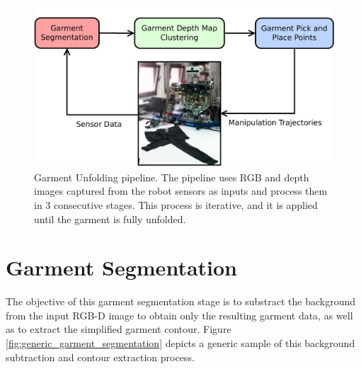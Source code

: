 \begin{figure}[thpb]
    \centering
    \includegraphics[width=\textwidth]
    {figures/Main_diagram.pdf}
    \caption{Garment Unfolding pipeline. The pipeline uses RGB and depth images captured from the robot sensors as inputs and process them in 3 consecutive stages. This process is iterative, and it is applied until the garment is fully unfolded.}
    \label{fig:pipeline_block_diagram}
\end{figure}

\section{Garment Segmentation}
\label{architecture:garment_segmentation}

The objective of this garment segmentation stage is to substract the background from the input RGB-D image to obtain only the resulting garment data, as well as to extract the simplified garment contour. Figure \ref{fig:generic_garment_segmentation} depicts a generic sample of this background subtraction and contour extraction process.




